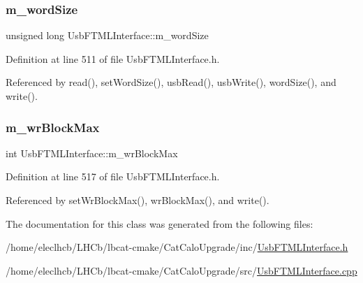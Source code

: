 \mbox{\label{classUsbFTMLInterface_a39a8dfbe54cc29e033fa2a4d5fbbc982}} 
\subsubsection{\texorpdfstring{m\+\_\+word\+Size}{m\_wordSize}}
{\footnotesize\ttfamily unsigned long Usb\+F\+T\+M\+L\+Interface\+::m\+\_\+word\+Size\hspace{0.3cm}{\ttfamily [private]}}



Definition at line 511 of file Usb\+F\+T\+M\+L\+Interface.\+h.



Referenced by read(), set\+Word\+Size(), usb\+Read(), usb\+Write(), word\+Size(), and write().

\mbox{\label{classUsbFTMLInterface_adb3d6b099e8283d80360f78fab064285}} 
\subsubsection{\texorpdfstring{m\+\_\+wr\+Block\+Max}{m\_wrBlockMax}}
{\footnotesize\ttfamily int Usb\+F\+T\+M\+L\+Interface\+::m\+\_\+wr\+Block\+Max\hspace{0.3cm}{\ttfamily [private]}}



Definition at line 517 of file Usb\+F\+T\+M\+L\+Interface.\+h.



Referenced by set\+Wr\+Block\+Max(), wr\+Block\+Max(), and write().



The documentation for this class was generated from the following files\+:\begin{DoxyCompactItemize}
\item 
/home/eleclhcb/\+L\+H\+Cb/lbcat-\/cmake/\+Cat\+Calo\+Upgrade/inc/\hyperlink{UsbFTMLInterface_8h}{Usb\+F\+T\+M\+L\+Interface.\+h}\item 
/home/eleclhcb/\+L\+H\+Cb/lbcat-\/cmake/\+Cat\+Calo\+Upgrade/src/\hyperlink{UsbFTMLInterface_8cpp}{Usb\+F\+T\+M\+L\+Interface.\+cpp}\end{DoxyCompactItemize}
